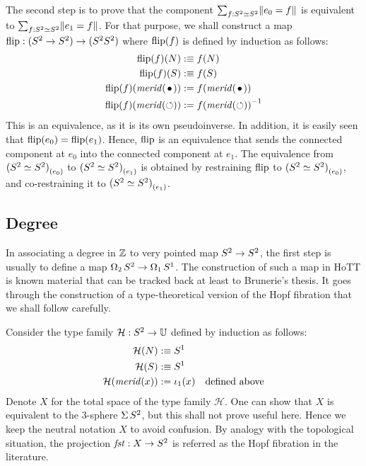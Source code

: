 \documentclass[english,a4]{article}
\def\U{\universe U}%
\begin{document}
The second step is to prove that the component
$\sum_{f:S^2 \simeq S^2}\lVert e_0=f\rVert$ is equivalent to
$\sum_{f:S^2 \simeq S^2}\lVert e_1=f\rVert$. For that purpose, we shall
construct a map $\operatorname{flip} : (S^2 \to S^2) \to (S^2 S^2)$ where $\operatorname{flip}(f)$
is defined by induction as follows:
\begin{equation}
  \label{eq:19}
  \begin{aligned}
    \flip(f)(N) &\defequi f(N)
    \\
    \flip(f)(S) &\defequi f(S)
    \\
    \flip(f)(\mrd(\base)) &\defis f(\mrd(\base))
    \\
    \flip(f)(\mrd(\Sloop)) &\defis \inv{f(\mrd(\Sloop))}
  \end{aligned}
\end{equation}
This is an equivalence, as it is its own pseudoinverse. In addition,
it is easily seen that $\operatorname{flip}(e_0) = \operatorname{flip}(e_1)$. Hence, $\operatorname{flip}$ is an
equivalence that sends the connected component at $e_0$ into the
connected component at $e_1$. The equivalence from
${(S^2\simeq S^2)}_{(e_0)}$ to ${(S^2\simeq S^2)}_{(e_1)}$ is
obtained by restraining $\operatorname{flip}$ to ${(S^2\simeq S^2)}_{(e_0)}$, and
co-restraining it to ${(S^2\simeq S^2)}_{(e_1)}$.

\subsection{Degree}
\label{sec:winding-numbers}
\def\hopffam{\mathcal H}%
\def\loopspace#1{\operatorname{\Omega_{#1}}}%

In associating a degree in $\mathbb{Z}$ to very pointed map $S^2 \to S^2$,
the first step is usually to define a map
$\loopspace 2 \Sp \to \loopspace 1 \Sc$. The construction of such a
map in HoTT is known material that can be tracked back at least to
Brunerie's thesis. It goes through the construction of a
type-theoretical version of the Hopf fibration that we shall follow
carefully.

Consider the type family $\hopffam : \Sp \to \U$ defined by induction
as follows:
\begin{equation}
  \label{eq:7}
  \begin{aligned}
    \hopffam (N) &\defequi \Sc
    \\
    \hopffam (S) &\defequi \Sc
    \\
    \hopffam (\mrd(x)) &\defis \iota_1(x) \quad\text{defined above}
  \end{aligned}
\end{equation}
Denote $X$ for the total space of the type family $\hopffam$. One can
show that $X$ is equivalent to the 3-sphere $\operatorname{\Sigma}{S^2}$, but this
shall not prove useful here. Hence we keep the neutral notation $X$ to
avoid confusion. By analogy with the topological situation, the
projection $\mathop{\mathit{fst}} : X\to S^2$ is referred as the Hopf fibration in the
literature.
\end{document}
